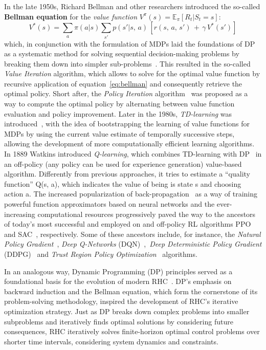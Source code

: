 In the late 1950s, Richard Bellman and other researchers introduced the so-called \textbf{Bellman equation} for the \textit{value function} $V^{\pi}(s) = \mathbb{E}_\pi [R_t|S_t=s]$:
\begin{equation}\label{eq:bellman}
	V^{*}(s) = \sum_{a} \pi(a|s) \sum_{s'} p(s'|s,\,a) \,[r(s,\,a,\,s')\,+\,\gamma\,V^{*}(s')]
\end{equation}
which, in conjunction with the formulation of MDPs laid the foundations of DP as a systematic method for solving sequential decision-making problems by breaking them down into simpler sub-problems~\cite{rl:bellman1960dynamic}. This resulted in the so-called \textit{Value Iteration} algorithm, which allows to solve for the optimal value function by recursive application of equation~\eqref{eq:bellman} and consequently retrieve the optimal policy. Short after, the \textit{Policy Iteration} algorithm~\cite{rl:howard1960dynamic} was proposed as a way to compute the optimal policy by alternating between value function evaluation and policy improvement. Later in the 1980s, \textit{TD-learning} was introduced~\cite{rl:barto1983neuronlike}, with the idea of bootstrapping the learning of value functions for MDPs by
using the current value estimate of temporally successive steps, allowing the development of more computationally efficient learning algorithms. In 1889 Watkins introduced \textit{Q-learning}, which combines TD-learning with DP~\cite{rl:watkins1989learning} in an off-policy (any policy can be used for experience generation) value-based algorithm. Differently from previous approaches, it tries to estimate a ``quality function'' Q(s, a), which indicates the value of being is state s and choosing action a. The increased popularization of back-propagation~\cite{rl:rumelhart1986learning} as a way of training powerful function approximators based on neural networks and the ever-increasing computational resources progressively paved the way to the ancestors of today's most successful and employed on and off-policy RL algorithms PPO~\cite{rl:schulman2017proximal} and SAC~\cite{rl:haarnoja2018soft}, respectively. Some of these ancestors include, for instance, the \textit{Natural Policy Gradient}~\cite{rl:kakade2001natural}, \textit{Deep Q-Networks} (DQN)~\cite{rl:mnih2015human},~\textit{Deep Deterministic Policy Gradient} (DDPG)~\cite{rl:lillicrap2015continuous} and \textit{Trust Region Policy Optimization}~\cite{rl:schulman2015trust} algorithms.

In an analogous way, Dynamic Programming (DP) principles served as a foundational basis for the evolution of modern RHC~\cite{modern_mpc:grandia2023perceptive}.
DP's emphasis on backward induction and the Bellman equation, which form the cornerstone of its problem-solving methodology, inspired the development of RHC's iterative optimization strategy. Just as DP breaks down complex problems into smaller subproblems and iteratively finds optimal solutions by considering future consequences, RHC iteratively solves finite-horizon optimal control problems over shorter time intervals, considering system dynamics and constraints. 

